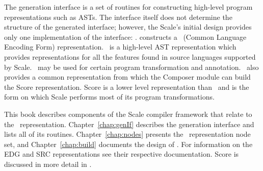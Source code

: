 The generation interface is a set of routines for constructing
high-level program representations such as ASTs.  The interface itself
does not determine the structure of the generated interface; however,
the Scale's initial design provides only one implementation of the
interface: .   constructs a
\clef\ (Common Language Encoding Form) representation.  \clef\ is a
high-level AST representation which provides representations for all
the features found in source languages supported by Scale.  \clef\ may
be used for certain program transformation and annotation.  \clef\ also
provides a common representation from which the Composer module can
build the Score representation.  Score is a lower level representation
than \clef\ and is the form on which Scale performs most of its program
transformations.

This book describes components of the Scale compiler framework that
relate to the \clef\ representation.  Chapter~\ref{chap:genIf}
describes the generation interface and lists all of its routines.
Chapter~\ref{chap:nodes} presents the \clef\ representation node set,
and Chapter~\ref{chap:build} documents the design of
.  For information on the EDG and SRC
representations see their respective documentation.  Score is
discussed in more detail in \cite{hcw96}.



